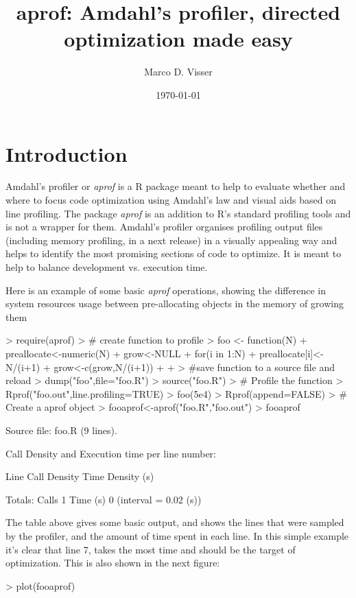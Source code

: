 \documentclass{article}
\begin{document}

\title{aprof: Amdahl's profiler, directed optimization made easy}
\date{\today}
\author{Marco D. Visser}
\maketitle

\section{Introduction}

Amdahl's profiler or \textit{aprof} is a R package meant to help to evaluate whether and where to focus code optimization using Amdahl's law and visual aids based on line profiling. The package \textit{aprof} is an addition to R's standard profiling tools and is not a wrapper for them. Amdahl's profiler organises profiling output files (including memory profiling, in a next release) in a visually appealing way and helps to identify the most promising sections of code to optimize. It is meant to help to balance development vs. execution time. 


Here is an example of some basic \textit{aprof} operations, showing the difference in system resources usage between pre-allocating objects in the memory of growing them

\begin{Schunk}
\begin{Sinput}
> require(aprof)
> # create function to profile
>      foo <- function(N){
+              preallocate<-numeric(N)
+              grow<-NULL
+               for(i in 1:N){
+                   preallocate[i]<-N/(i+1)
+                   grow<-c(grow,N/(i+1))
+                  }
+             }
>      #save function to a source file and reload
>      dump("foo",file="foo.R")
>      source("foo.R")
>      # Profile the function
>      Rprof("foo.out",line.profiling=TRUE)
>      foo(5e4)
>      Rprof(append=FALSE)
>      # Create a aprof object
>      fooaprof<-aprof("foo.R","foo.out")
>      fooaprof
\end{Sinput}
\begin{Soutput}
Source file:
foo.R (9 lines).

 Call Density and Execution time per line number:

      Line  Call Density  Time Density (s)

 Totals:
 Calls		 1 
 Time (s)	 0 	(interval = 	 0.02 (s))
\end{Soutput}
\end{Schunk}

The table above gives some basic output, and shows the lines that were sampled by the profiler, and the amount of time spent in each line. In this simple example it's clear that line 7, takes the most time and should be the target of optimization. This is also shown in the next figure:

\begin{Schunk}
\begin{Sinput}
> plot(fooaprof)
\end{Sinput}
\end{Schunk}
\end{document}
